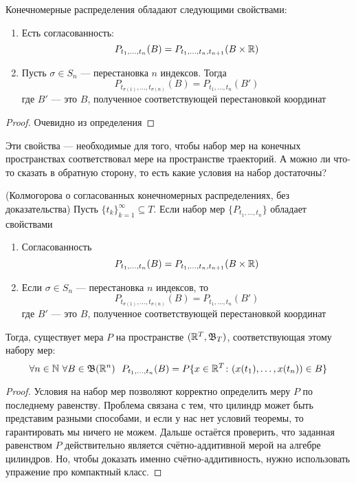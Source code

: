 \begin{proposition}
	Конечномерные распределения обладают следующими свойствами:
	\begin{enumerate}
		\item Есть согласованность:
		\[
		P_{t_1, \ldots, t_n}(B) = P_{t_1, \ldots, t_n, t_{n + 1}}(B \times \mathbb{R})
		\]
		
		\item Пусть $\sigma \in S_n$ --- перестановка $n$ индексов. Тогда
		\[
		P_{t_{\sigma(1)}, \ldots, t_{\sigma(n)}}(B) = P_{t_1, \ldots, t_n}(B')
		\]
		где $B'$ --- это $B$, полученное соответствующей перестановкой координат
	\end{enumerate}
\end{proposition}

\begin{proof}
	Очевидно из определения
\end{proof}

\begin{note}
	Эти свойства --- необходимые для того, чтобы набор мер на конечных пространствах соответствовал мере на пространстве траекторий. А можно ли что-то сказать в обратную сторону, то есть какие условия на набор достаточны?
\end{note}

\begin{theorem} (Колмогорова о согласованных конечномерных распределениях, без доказательства) \label{proc_existence_crit}
	Пусть $\{t_k\}_{k = 1}^\infty \subseteq T$. Если набор мер $\{P_{t_1, \ldots, t_n}\}$ обладает свойствами
	\begin{enumerate}
		\item Согласованность
		\[
		P_{t_1, \ldots, t_n}(B) = P_{t_1, \ldots, t_n, t_{n + 1}}(B \times \mathbb{R})
		\]
		
		\item Если $\sigma \in S_n$ --- перестановка $n$ индексов, то
		\[
		P_{t_{\sigma(1)}, \ldots, t_{\sigma(n)}}(B) = P_{t_1, \ldots, t_n}(B')
		\]
		где $B'$ --- это $B$, полученное соответствующей перестановкой координат
	\end{enumerate}
	Тогда, существует мера $P$ на пространстве $(\mathbb{R}^T, \mathfrak{B}_T)$, соответствующая этому набору мер:
	\[
	\forall n \in \mathbb{N}\ \forall B \in \mathfrak{B}(\mathbb{R}^n)\ \ P_{t_1, \ldots, t_n}(B) = P\{x \in \mathbb{R}^T \colon (x(t_1), \ldots, x(t_n)) \in B\}
	\]
\end{theorem}

\begin{proof}
	Условия на набор мер позволяют корректно определить меру $P$ по последнему равенству. Проблема связана с тем, что цилиндр может быть представим разными способами, и если у нас нет условий теоремы, то гарантировать мы ничего не можем. Дальше остаётся проверить, что заданная равенством $P$ действительно является счётно-аддитивной мерой на алгебре цилиндров. Но, чтобы доказать именно счётно-аддитивность, нужно использовать упражение про компактный класс.
\end{proof}

